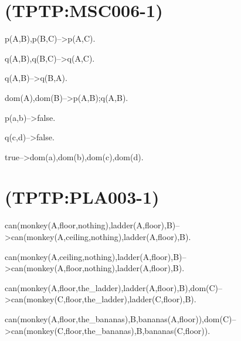 \newline
\section{(TPTP:MSC006-1)}



p(A,B),p(B,C)-->p(A,C).

q(A,B),q(B,C)-->q(A,C).

q(A,B)-->q(B,A).

dom(A),dom(B)-->p(A,B);q(A,B).

p(a,b)-->false.

q(c,d)-->false.

true-->dom(a),dom(b),dom(c),dom(d).

\newline
\section{(TPTP:PLA003-1)}



can(monkey(A,floor,nothing),ladder(A,floor),B)-->can(monkey(A,ceiling,nothing),ladder(A,floor),B).

can(monkey(A,ceiling,nothing),ladder(A,floor),B)-->can(monkey(A,floor,nothing),ladder(A,floor),B).

can(monkey(A,floor,the_ladder),ladder(A,floor),B),dom(C)-->can(monkey(C,floor,the_ladder),ladder(C,floor),B).

can(monkey(A,floor,the_bananas),B,bananas(A,floor)),dom(C)-->can(monkey(C,floor,the_bananas),B,bananas(C,floor)).

